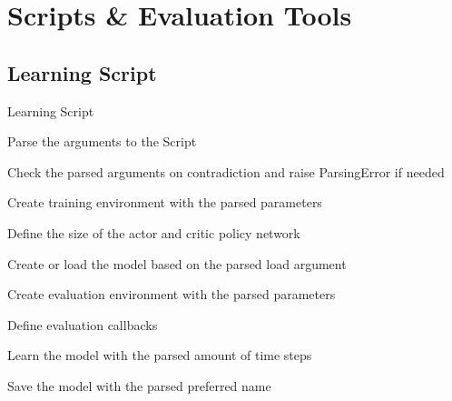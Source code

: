 \newpage

\section{Scripts \& Evaluation Tools} \label{sec:scripts}



\subsection{Learning Script}
\begin{algorithm}
	\caption{Learning Script}
	\label{alg:learn}
	 Parse the arguments to the Script
	 
	 Check the parsed arguments on contradiction and raise ParsingError if needed
	 
	 Create training environment with the parsed parameters
	 
	 Define the size of the actor and critic policy network
	 
	 Create or load the model based on the parsed load argument
	 
	 Create evaluation environment with the parsed parameters
	 
	 Define evaluation callbacks
	 
	 Learn the model with the parsed amount of time steps
	 
	 Save the model with the parsed preferred name
	 
	 
\end{algorithm}

\newpage

